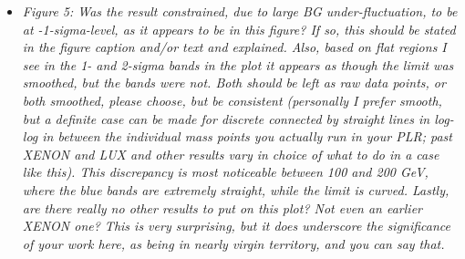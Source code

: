 \documentclass{article}
\begin{document}
\begin{itemize}
	\item \em{
Figure 5: Was the result constrained, due to large BG
under-fluctuation, to be at -1-sigma-level, as it appears to be in
this figure? If so, this should be stated in the figure caption and/or
text and explained. Also, based on flat regions I see in the 1- and
2-sigma bands in the plot it appears as though the limit was smoothed,
but the bands were not. Both should be left as raw data points, or
both smoothed, please choose, but be consistent (personally I prefer
smooth, but a definite case can be made for discrete connected by
straight lines in log-log in between the individual mass points you
actually run in your PLR; past XENON and LUX and other results vary in
choice of what to do in a case like this). This discrepancy is most
noticeable between 100 and 200 GeV, where the blue bands are extremely
straight, while the limit is curved. Lastly, are there really no other
results to put on this plot? Not even an earlier XENON one? This is
very surprising, but it does underscore the significance of your work
here, as being in nearly virgin territory, and you can say that.}
\end{itemize}
\end{document}

